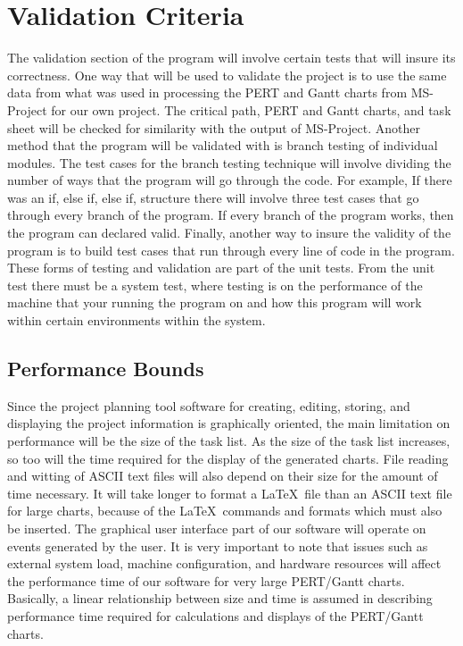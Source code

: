 \section{Validation Criteria}

The validation section of the program will involve certain tests that
will insure its correctness. One way that will be used to validate the
project is to use the same data from what was used in processing the
PERT and Gantt charts from MS-Project for our own project. The
critical path, PERT and Gantt charts, and task sheet will be checked
for similarity with the output of MS-Project.  Another method that the
program will be validated with is branch testing of individual
modules.  The test cases for the branch testing technique will involve
dividing the number of ways that the program will go through the code.
For example, If there was an if, else if, else if, structure there
will involve three test cases that go through every branch of the
program. If every branch of the program works, then the program can
declared valid. Finally, another way to insure the validity of the
program is to build test cases that run through every line of code in
the program.  These forms of testing and validation are part of the
unit tests. From the unit test there must be a system test, where
testing is on the performance of the machine that your running the
program on and how this program will work within certain environments
within the system.

\subsection{Performance Bounds}

Since the project planning tool software for creating, editing,
storing, and displaying the project information is graphically
oriented, the main limitation on performance will be the size of the
task list.  As the size of the task list increases, so too will the
time required for the display of the generated charts. File reading
and witting of ASCII text files will also depend on their size for the
amount of time necessary.  It will take longer to format a \LaTeX\
file than an ASCII text file for large charts, because of the
\LaTeX\ commands and formats which must also be inserted.  The
graphical user interface part of our software will operate on events
generated by the user. It is very important to note that issues such
as external system load, machine configuration, and hardware resources
will affect the performance time of our software for very large
PERT/Gantt charts.  Basically, a linear relationship between size and
time is assumed in describing performance time required for
calculations and displays of the PERT/Gantt charts.

